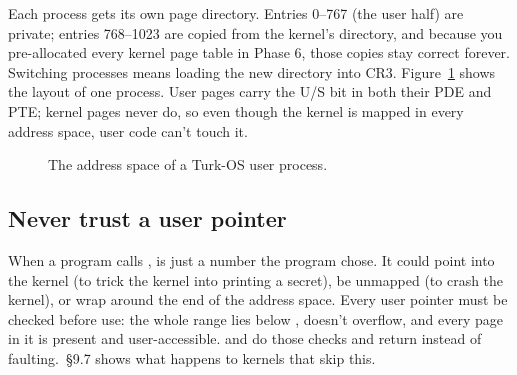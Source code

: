 \documentclass[11pt,a4paper]{article}
\begin{document}
Each process gets its own page directory. Entries 0--767 (the user half) are private; entries 768--1023 are copied
from the kernel's directory, and because you pre-allocated every kernel page table in Phase 6, those copies stay
correct forever. Switching processes means loading the new directory into CR3. Figure~\ref{fig:uas} shows the layout
of one process. User pages carry the U/S bit in both their PDE and PTE; kernel pages never do, so even though the
kernel is mapped in every address space, user code can't touch it.

\begin{figure}[htbp]
\centering
{}
\caption{The address space of a Turk-OS user process.}
\label{fig:uas}
\end{figure}

\subsection{Never trust a user pointer}

When a program calls ,  is just a number the program chose. It could point into
the kernel (to trick the kernel into printing a secret), be unmapped (to crash the kernel), or wrap around the end of
the address space. Every user pointer must be checked before use: the whole range lies below ,
doesn't overflow, and every page in it is present and user-accessible.  and
 do those checks and return  instead of faulting. \MOS\,\S9.7 shows what happens
to kernels that skip this.
\end{document}
